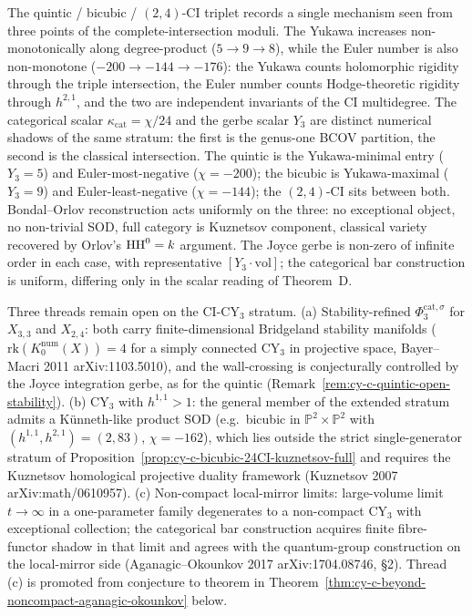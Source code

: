 \begin{remark}
\label{rem:cy-c-ci-cy3-degree-vs-euler}
The quintic / bicubic / $(2,4)$-CI triplet records a single mechanism
seen from three points of the complete-intersection moduli. The
Yukawa increases non-monotonically along degree-product
($5 \to 9 \to 8$), while the Euler number is also non-monotone
($-200 \to -144 \to -176$): the Yukawa counts holomorphic rigidity
through the triple intersection, the Euler number counts
Hodge-theoretic rigidity through $h^{2,1}$, and the two are
independent invariants of the CI multidegree. The categorical scalar
$\kappa_{\mathrm{cat}} = \chi/24$ and the gerbe scalar $Y_3$ are
distinct numerical shadows of the same stratum: the first is the
genus-one BCOV partition, the second is the classical intersection.
The quintic is the Yukawa-minimal entry ($Y_3 = 5$) and
Euler-most-negative ($\chi = -200$); the bicubic is Yukawa-maximal
($Y_3 = 9$) and Euler-least-negative ($\chi = -144$); the $(2,4)$-CI
sits between both. Bondal--Orlov reconstruction acts uniformly on
the three: no exceptional object, no non-trivial SOD, full category
is Kuznetsov component, classical variety recovered by Orlov's
$\mathrm{HH}^0 = k$ argument. The Joyce gerbe is non-zero of infinite order
in each case, with representative $[Y_3 \cdot \mathrm{vol}]$; the
categorical bar construction is uniform, differing only in the
scalar reading of Theorem~D.
\end{remark}

\begin{remark}
\label{rem:cy-c-ci-cy3-open-threads}
Three threads remain open on the CI-CY$_3$ stratum.
\textup{(a)} Stability-refined $\Phi_3^{\mathrm{cat}, \sigma}$ for
$X_{3,3}$ and $X_{2,4}$: both carry finite-dimensional Bridgeland
stability manifolds
($\mathrm{rk}(K_0^{\mathrm{num}}(X)) = 4$ for a simply connected
CY$_3$ in projective space, Bayer--Macri 2011 arXiv:1103.5010), and
the wall-crossing is conjecturally controlled by the Joyce
integration gerbe, as for the quintic
(Remark~\ref{rem:cy-c-quintic-open-stability}).
\textup{(b)} CY$_3$ with $h^{1,1} > 1$: the general member of the
extended stratum admits a K\"unneth-like product SOD (e.g.\ bicubic in
$\mathbb P^2 \times \mathbb P^2$ with
$(h^{1,1}, h^{2,1}) = (2, 83)$, $\chi = -162$), which lies outside
the strict single-generator stratum of
Proposition~\ref{prop:cy-c-bicubic-24CI-kuznetsov-full} and requires
the Kuznetsov homological projective duality framework (Kuznetsov
2007 arXiv:math/0610957).
\textup{(c)} Non-compact local-mirror limits: large-volume limit
$t \to \infty$ in a one-parameter family degenerates to a
non-compact CY$_3$ with exceptional collection; the categorical bar
construction acquires finite fibre-functor shadow in that limit and
agrees with the quantum-group construction on the local-mirror side
(Aganagic--Okounkov 2017 arXiv:1704.08746, \S 2). Thread (c) is
promoted from conjecture to theorem in
Theorem~\ref{thm:cy-c-beyond-noncompact-aganagic-okounkov} below.
\end{remark}

